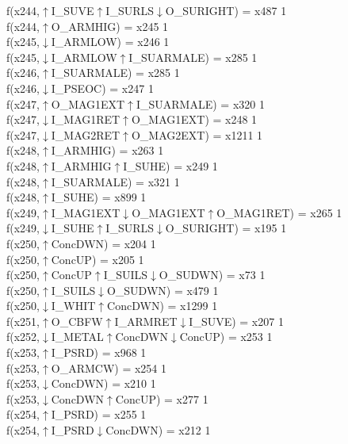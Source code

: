 f(x244,$\uparrow$I\_SUVE$\uparrow$I\_SURLS$\downarrow$O\_SURIGHT) = x487 {1} \\
f(x244,$\uparrow$O\_ARMHIG) = x245 {1} \\
f(x245,$\downarrow$I\_ARMLOW) = x246 {1} \\
f(x245,$\downarrow$I\_ARMLOW$\uparrow$I\_SUARMALE) = x285 {1} \\
f(x246,$\uparrow$I\_SUARMALE) = x285 {1} \\
f(x246,$\downarrow$I\_PSEOC) = x247 {1} \\
f(x247,$\uparrow$O\_MAG1EXT$\uparrow$I\_SUARMALE) = x320 {1} \\
f(x247,$\downarrow$I\_MAG1RET$\uparrow$O\_MAG1EXT) = x248 {1} \\
f(x247,$\downarrow$I\_MAG2RET$\uparrow$O\_MAG2EXT) = x1211 {1} \\
f(x248,$\uparrow$I\_ARMHIG) = x263 {1} \\
f(x248,$\uparrow$I\_ARMHIG$\uparrow$I\_SUHE) = x249 {1} \\
f(x248,$\uparrow$I\_SUARMALE) = x321 {1} \\
f(x248,$\uparrow$I\_SUHE) = x899 {1} \\
f(x249,$\uparrow$I\_MAG1EXT$\downarrow$O\_MAG1EXT$\uparrow$O\_MAG1RET) = x265 {1} \\
f(x249,$\downarrow$I\_SUHE$\uparrow$I\_SURLS$\downarrow$O\_SURIGHT) = x195 {1} \\
f(x250,$\uparrow$ConcDWN) = x204 {1} \\
f(x250,$\uparrow$ConcUP) = x205 {1} \\
f(x250,$\uparrow$ConcUP$\uparrow$I\_SUILS$\downarrow$O\_SUDWN) = x73 {1} \\
f(x250,$\uparrow$I\_SUILS$\downarrow$O\_SUDWN) = x479 {1} \\
f(x250,$\downarrow$I\_WHIT$\uparrow$ConcDWN) = x1299 {1} \\
f(x251,$\uparrow$O\_CBFW$\uparrow$I\_ARMRET$\downarrow$I\_SUVE) = x207 {1} \\
f(x252,$\downarrow$I\_METAL$\uparrow$ConcDWN$\downarrow$ConcUP) = x253 {1} \\
f(x253,$\uparrow$I\_PSRD) = x968 {1} \\
f(x253,$\uparrow$O\_ARMCW) = x254 {1} \\
f(x253,$\downarrow$ConcDWN) = x210 {1} \\
f(x253,$\downarrow$ConcDWN$\uparrow$ConcUP) = x277 {1} \\
f(x254,$\uparrow$I\_PSRD) = x255 {1} \\
f(x254,$\uparrow$I\_PSRD$\downarrow$ConcDWN) = x212 {1} \\
